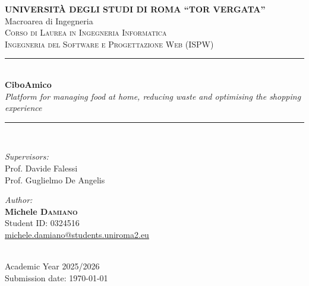 \documentclass[12pt,a4paper,oneside]{report}
\begin{document}
\begin{titlepage}
    \centering
    \large
    \textbf{UNIVERSITÀ DEGLI STUDI DI ROMA ``TOR VERGATA''} \\[0.3cm]
    \large Macroarea di Ingegneria \\[1.2cm]

    \scshape\Large Corso di Laurea in Ingegneria Informatica \\[0.3cm]
    \large Ingegneria del Software e Progettazione Web (ISPW) \\[1.5cm]

    \rule{\linewidth}{0.4mm} \\[0.4cm]
    {\huge\bfseries CiboAmico} \\[0.3cm]
    \large\itshape Platform for managing food at home, reducing waste and optimising the shopping experience \\
    \rule{\linewidth}{0.4mm} \\[1.5cm]

    \begin{minipage}{0.5\textwidth}
        \begin{flushleft} \large
            \emph{Supervisors:} \\
            Prof. Davide Falessi \\
            Prof. Guglielmo De Angelis
        \end{flushleft}
    \end{minipage}
    \hfill
    \begin{minipage}{0.42\textwidth}
        \begin{flushright} \large
            \emph{Author:} \\
            \textbf{Michele \textsc{Damiano}} \\
            Student ID: 0324516 \\
            \href{mailto:michele.damiano@students.uniroma2.eu}{\small michele.damiano@students.uniroma2.eu}
        \end{flushright}
    \end{minipage} \\[2.5cm]

    \vfill
    {\large Academic Year 2025/2026} \\[0.2cm]
    {\large Submission date: \today}
\end{titlepage}

\tableofcontents
\newpage








\end{document}
